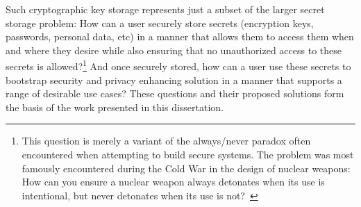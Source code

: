 Such cryptographic key storage represents just a subset of the larger
secret storage problem: How can a user securely store secrets
(encryption keys, passwords, personal data, etc) in a manner that
allows them to access them when and where they desire while also
ensuring that no unauthorized access to these secrets is
allowed?\footnote{This question is merely a variant of the
  always/never paradox often encountered when attempting to build
  secure systems. The problem was most famously encountered during the
  Cold War in the design of nuclear weapons: How can you ensure a
  nuclear weapon always detonates when its use is intentional, but
  never detonates when its use is not?~\cite{schlosser2013}} And once
securely stored, how can a user use these secrets to bootstrap
security and privacy enhancing solution in a manner that supports a
range of desirable use cases?  These questions and their proposed
solutions form the basis of the work presented in this dissertation.

